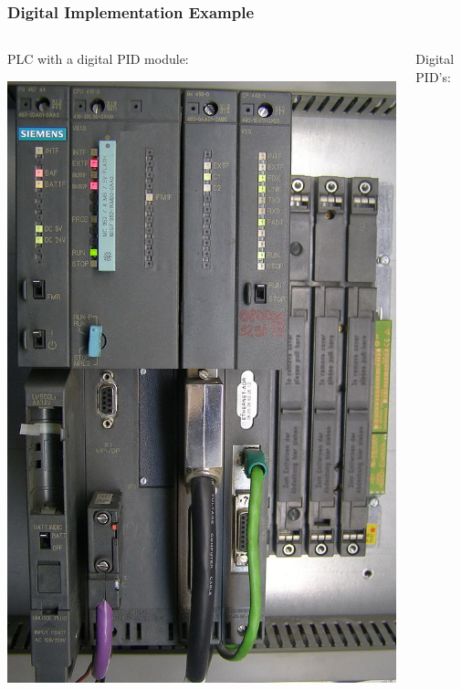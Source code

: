 \begin{frame}
	\frametitle{Digital Implementation Example}
	\begin{columns}
		\begin{column}{0.5\linewidth}
			\centering PLC with a digital PID module:
			
			\vspace{1em}
			\includegraphics[height=0.7\textheight]{img/640px-Siemens_Simatic_S7-416-3}
		\end{column}
		\begin{column}{0.5\linewidth}
			\centering Digital PID's:
			\vspace{1em}
			\begin{columns}
				\begin{column}{0.4\linewidth}

\end{column}
\end{columns}
\end{column}
\end{columns}
\end{frame}
